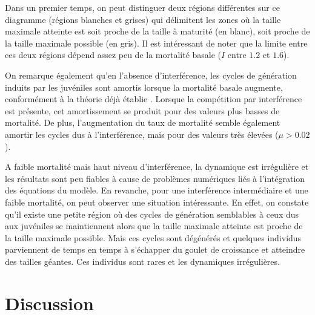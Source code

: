 Dans un premier temps, on peut distinguer deux régions différentes sur ce
diagramme (régions blanches et grises) qui délimitent les zones où
la taille maximale atteinte est soit proche de la taille à maturité (en blanc),
soit proche de la taille maximale possible (en gris). Il est intéressant de
noter que la limite entre ces deux régions dépend assez peu de la mortalité basale
($I$ entre $1.2$ et $1.6$).

On remarque également qu'en l'absence d'interférence, les cycles de génération
induits par les juvéniles sont amortis lorsque la mortalité basale augmente,
conformément à la théorie déjà établie \autocites{de-roos1997a}. Lorsque la
compétition par interférence est présente, cet amortissement se produit pour
des valeurs plus basses de mortalité. De plus, l'augmentation du taux de
mortalité semble également amortir les cycles dus à l'interférence, mais pour
des valeurs très élevées ($\mu > 0.02$). 

A faible mortalité mais haut niveau d'interférence, la dynamique est irrégulière
et les résultats sont peu fiables à cause de problèmes numériques liés à
l'intégration des équations du modèle. En revanche, pour une interférence
intermédiaire et une faible mortalité, on peut observer une situation
intéressante. En effet, on constate qu'il existe une petite région où des cycles
de génération semblables à ceux dus aux juvéniles se maintiennent alors que la
taille maximale atteinte est proche de la taille maximale possible. Mais ces
cycles sont dégénérés et quelques individus parviennent de temps en temps à
s'échapper du goulet de croissance et atteindre des tailles géantes. Ces
individus sont rares et les dynamiques irrégulières. 

\section{Discussion}

